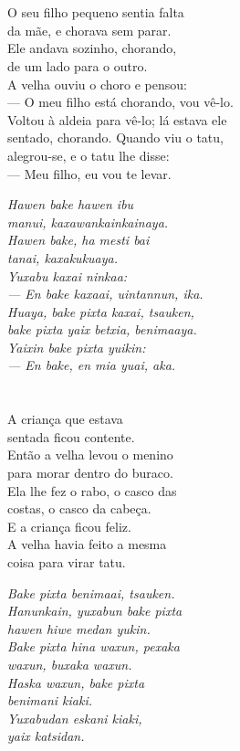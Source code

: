 \chapter{}

O seu filho pequeno sentia falta\\
da mãe, e chorava sem parar.\\
Ele andava sozinho, chorando,\\
de um lado para o outro.\\
A velha ouviu o choro e pensou:\\
--- O meu filho está chorando, vou vê-lo.\\
Voltou à aldeia para vê-lo; lá estava ele\\
sentado, chorando. Quando viu o tatu,\\
alegrou-se, e o tatu lhe disse:\\
--- Meu filho, eu vou te levar.

\textit{Hawen bake hawen ibu\\
manui, kaxawankainkainaya.\\
Hawen bake, ha mesti bai\\
tanai, kaxakukuaya.\\
Yuxabu kaxai ninkaa:\\
--- En bake kaxaai, uintannun, ika.\\
Huaya, bake pixta kaxai, tsauken,\\
bake pixta yaix betxia, benimaaya.\\
Yaixin bake pixta yuikin:\\
--- En bake, en mia yuai, aka.}

\chapter{}

A criança que estava\\
sentada ficou contente.\\
Então a velha levou o menino\\
para morar dentro do buraco.\\
Ela lhe fez o rabo, o casco das\\
costas, o casco da cabeça.\\
E a criança ficou feliz.\\
A velha havia feito a mesma\\
coisa para virar tatu.

\textit{Bake pixta benimaai, tsauken.\\
Hanunkain, yuxabun bake pixta\\
hawen hiwe medan yukin.\\
Bake pixta hina waxun, pexaka\\
waxun, buxaka waxun.\\
Haska waxun, bake pixta\\
benimani kiaki.\\
Yuxabudan eskani kiaki,\\
yaix katsidan.}

